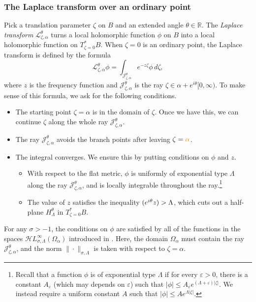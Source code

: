 \documentclass{article}
\let\Re\relax
\DeclareMathOperator{\Re}{Re}
\newcommand{\singexp}[2]{\mathcal{H}L^\infty_{#1, #2}}
\newcommand{\R}{\mathbb{R}}
\newcommand{\laplace}{\mathcal{L}}
\theoremstyle{definition}
\theoremstyle{plain}
\begin{document}
\subsubsection{The Laplace transform over an ordinary point}\label{laplace:ordinary}
Pick a translation parameter $\zeta$ on $B$ and an extended angle $\theta \in \R$. The {\em Laplace transform} $\laplace_{\zeta, \alpha}^\theta$ turns a local holomorphic function $\phi$ on $B$ into a local holomorphic function on $T^*_{\zeta = 0} B$. When $\zeta = 0$ is an ordinary point, the Laplace transform is defined by the formula
\begin{equation}\label{laplace:int}
\laplace_{\zeta, \alpha}^\theta \phi = \int_{\mathcal{J}_{\zeta, \alpha}^\theta} e^{-z\zeta} \phi\,d\zeta,
\end{equation}
where $z$ is the frequency function and $\mathcal{J}_{\zeta, \alpha}^\theta$ is the ray $\zeta \in \alpha + e^{i\theta} [0, \infty)$. To make sense of this formula, we ask for the following conditions.
\begin{itemize}
\item The starting point $\zeta = \alpha$ is in the domain of $\zeta$. Once we have this, we can continue $\zeta$ along the whole ray $\mathcal{J}_{\zeta, \alpha}^\theta$.
\item The ray $\mathcal{J}_{\zeta, \alpha}^\theta$ avoids the branch points after leaving $\zeta = \textcolor{orange}{\alpha}$.
\item The integral converges. We ensure this by putting conditions on $\phi$ and $z$.
\begin{itemize}
\item With respect to the flat metric, $\phi$ is uniformly of exponential type $\Lambda$ along the ray $\mathcal{J}_{\zeta, \alpha}^\theta$, and is locally integrable throughout the ray.\footnote{Recall that a function $\phi$ is of exponential type $\Lambda$ if for every $\varepsilon>0$, there is a constant $A_\varepsilon$ (which may depends on $\varepsilon$) such that $|\phi|\le A_\varepsilon e^{(\Lambda+\varepsilon)|\zeta|}$. We instead require a uniform constant $A$ such that $|\phi| \le A e^{\Lambda|\zeta|}$.}
\item The value of $z$ satisfies the inequality $\Re(e^{i\theta} z) > \Lambda$, which cuts out a half-plane $H^\theta_\Lambda$ in $T^*_{\zeta = 0} B$.
\end{itemize}
\end{itemize}
For any $\sigma > -1$, the conditions on $\phi$ are satisfied by all of the functions in the spaces $\singexp{\sigma}{\Lambda}(\Omega_\alpha)$ introduced in \cite{reg-sing-volterra}. Here, the domain $\Omega_\alpha$ must contain the ray $\mathcal{J}_{\zeta, \alpha}^\theta$, and the norm $\|\cdot\|_{\sigma, \Lambda}$ is taken with respect to $\zeta = \alpha$.
\end{document}
